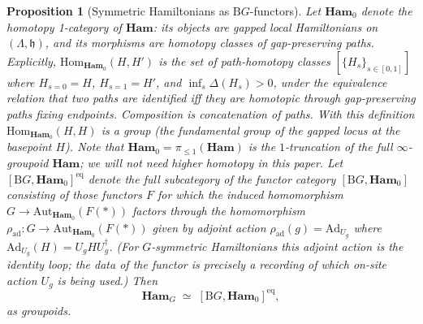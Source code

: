\documentclass[12pt]{article}
\theoremstyle{plain}
\newtheorem{proposition}[theorem]{Proposition}
\theoremstyle{definition}
\theoremstyle{remark}
\newcommand{\Ham}{\mathbf{Ham}}
\newcommand{\BG}{\mathrm{B}G}
\begin{document}
\begin{proposition}[Symmetric Hamiltonians as $\BG$-functors]
\label{prop:hamG-as-functor}
Let $\Ham_{0}$ denote the homotopy 1-category of $\Ham$: its objects are gapped local
Hamiltonians on $(\Lambda,\mathfrak{h})$, and its morphisms are \emph{homotopy classes}
of gap-preserving paths. Explicitly,
$\mathrm{Hom}_{\Ham_{0}}(H,H')$ is the set of path-homotopy classes
$[\{H_{s}\}_{s\in[0,1]}]$ where $H_{s=0}=H$, $H_{s=1}=H'$, and $\inf_{s}\Delta(H_{s})>0$,
under the equivalence relation that two paths are identified iff they are homotopic
through gap-preserving paths fixing endpoints. Composition is concatenation of paths.
With this definition $\mathrm{Hom}_{\Ham_{0}}(H,H)$ is a group (the fundamental group of
the gapped locus at the basepoint $H$). Note that $\Ham_{0}=\pi_{\leq 1}(\Ham)$ is the
$1$-truncation of the full $\infty$-groupoid $\Ham$; we will not need higher homotopy
in this paper. Let
$[\BG,\Ham_{0}]^{\mathrm{eq}}$ denote the full subcategory of the functor category
$[\BG,\Ham_{0}]$ consisting of those functors $F$ for which the induced homomorphism
$G\to\mathrm{Aut}_{\Ham_{0}}(F(\ast))$ factors through the homomorphism
$\rho_{\mathrm{ad}}:G\to\mathrm{Aut}_{\Ham_{0}}(F(\ast))$ given by adjoint action
$\rho_{\mathrm{ad}}(g)=\mathrm{Ad}_{U_{g}}$ where $\mathrm{Ad}_{U_{g}}(H)=U_{g}H
U_{g}^{\dagger}$. (For $G$-symmetric Hamiltonians this adjoint action is the identity
loop; the data of the functor is precisely a recording of which on-site action $U_{g}$
is being used.) Then
\[
\Ham_{G} \;\simeq\; [\BG,\Ham_{0}]^{\mathrm{eq}},
\]
as groupoids.
\end{proposition}
\end{document}
